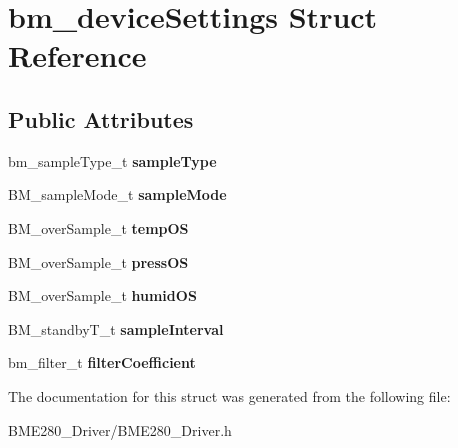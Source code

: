 \hypertarget{structbm__deviceSettings}{}\section{bm\+\_\+device\+Settings Struct Reference}
\label{structbm__deviceSettings}
\subsection*{Public Attributes}
\begin{DoxyCompactItemize}
\item 
\mbox{\label{structbm__deviceSettings_a6fe879b166151f3bfaf5a0ac1f7962ea}} 
bm\+\_\+sample\+Type\+\_\+t {\bfseries sample\+Type}
\item 
\mbox{\label{structbm__deviceSettings_abac93a0a0d1369273da8b0937b29d4c1}} 
B\+M\+\_\+sample\+Mode\+\_\+t {\bfseries sample\+Mode}
\item 
\mbox{\label{structbm__deviceSettings_ad1c4a858d81d9364d72c6ac59c4eccfa}} 
B\+M\+\_\+over\+Sample\+\_\+t {\bfseries temp\+OS}
\item 
\mbox{\label{structbm__deviceSettings_a68dd199eb5397c72a799a000e219ed36}} 
B\+M\+\_\+over\+Sample\+\_\+t {\bfseries press\+OS}
\item 
\mbox{\label{structbm__deviceSettings_a0540c69071e9c8fec6a7bbb1d8091e43}} 
B\+M\+\_\+over\+Sample\+\_\+t {\bfseries humid\+OS}
\item 
\mbox{\label{structbm__deviceSettings_a9e7e56f90ad7e6b2eaad04d58f48400b}} 
B\+M\+\_\+standby\+T\+\_\+t {\bfseries sample\+Interval}
\item 
\mbox{\label{structbm__deviceSettings_ae8c554fada240f44f28b4850848c42db}} 
bm\+\_\+filter\+\_\+t {\bfseries filter\+Coefficient}
\end{DoxyCompactItemize}


The documentation for this struct was generated from the following file\+:\begin{DoxyCompactItemize}
\item 
B\+M\+E280\+\_\+\+Driver/B\+M\+E280\+\_\+\+Driver.\+h\end{DoxyCompactItemize}
